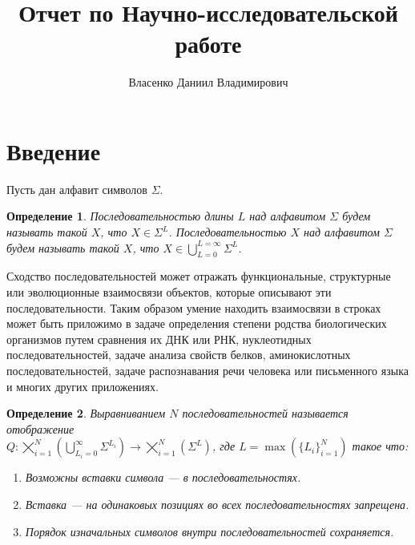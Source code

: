 \documentclass[specialist,
substylefile = spbu_report.rtx,
subf,href,colorlinks=true, 12pt]{disser}
\newtheorem{defenition}{Определение}
\begin{document}
	
	\title{Отчет по Научно-исследовательской работе}	
	\author{Власенко Даниил Владимирович}
	\date{\number\year}	
	\maketitle
	\tableofcontents
	
	
	\section{Введение}
		Пусть дан алфавит символов $\Sigma$. 
		\begin{defenition}Последовательностью длины $L$ над алфавитом $\Sigma$ будем называть такой $X$, что $X \in \Sigma^{L}$. Последовательностью $X$ над алфавитом $\Sigma$ будем называть такой $X$, что $X \in \bigcup_{L=0}^{L=\infty}\Sigma^{L}$.
		\end{defenition}
		
		Сходство последовательностей может отражать функциональные, структурные или эволюционные взаимосвязи объектов, которые описывают эти последовательности. Таким образом умение находить взаимосвязи в строках может быть приложимо в задаче определения степени родства биологических организмов путем сравнения их ДНК или РНК, нуклеотидных последовательностей, задаче анализа свойств белков, аминокислотных последовательностей, задаче распознавания речи человека или письменного языка и многих других приложениях. 
		
		\begin{defenition}
			Выравниванием $N$ последовательностей называется отображение \\$Q: \bigtimes_{i=1}^{N}(\bigcup_{L_i=0}^{\infty} \Sigma^{L_i}) \rightarrow \bigtimes_{i=1}^{N}(\Sigma^{L})$, где $L = \max(\{L_i\}_{i=1}^{N})$ такое что:
			\begin{enumerate}
				\item Возможны вставки символа --- в последовательностях.
				\item Вставка --- на одинаковых позициях во всех последовательностях запрещена.
				\item Порядок изначальных символов внутри последовательностей сохраняется.
			\end{enumerate}
		\end{defenition}		
		
\end{document}
